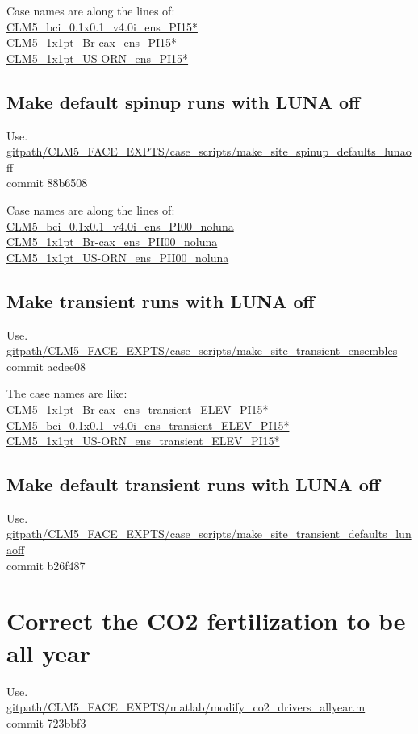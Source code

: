 \documentclass{article}
\begin{document}
Case names are along the lines of:\\
{\color{cyan}\small{\url{CLM5_bci_0.1x0.1_v4.0i_ens_PI15*}}\\
\small{\url{CLM5_1x1pt_Br-cax_ens_PI15*}}\\
\small{\url{CLM5_1x1pt_US-ORN_ens_PI15*}}}\\

\subsection{Make default spinup runs with LUNA off}
Use.\\
{\color{blue}\small{\url{gitpath/CLM5_FACE_EXPTS/case_scripts/make_site_spinup_defaults_lunaoff}} }\\
commit 88b6508  

Case names are along the lines of:\\
{\color{cyan}\small{\url{CLM5_bci_0.1x0.1_v4.0i_ens_PI00_noluna}}\\
\small{\url{CLM5_1x1pt_Br-cax_ens_PII00_noluna}}\\
\small{\url{CLM5_1x1pt_US-ORN_ens_PII00_noluna}}}\\

\subsection{Make transient runs with LUNA off}
Use.\\
{\color{blue}\small{\url{gitpath/CLM5_FACE_EXPTS/case_scripts/make_site_transient_ensembles}} }\\
commit acdee08

The case names are like:\\
{\color{cyan}\small{\url{CLM5_1x1pt_Br-cax_ens_transient_ELEV_PI15*}}}\\
{\color{cyan}\small{\url{CLM5_bci_0.1x0.1_v4.0i_ens_transient_ELEV_PI15*}}}\\
{\color{cyan}\small{\url{CLM5_1x1pt_US-ORN_ens_transient_ELEV_PI15*}}} 

\subsection{Make default transient runs with LUNA off}
Use.\\
{\color{blue}\small{\url{gitpath/CLM5_FACE_EXPTS/case_scripts/make_site_transient_defaults_lunaoff}} }\\
commit b26f487  


\section{Correct the CO2 fertilization to be all year}
Use.\\
{\color{blue}\small{\url{gitpath/CLM5_FACE_EXPTS/matlab/modify_co2_drivers_allyear.m }} }\\
commit 723bbf3      
\end{document}
